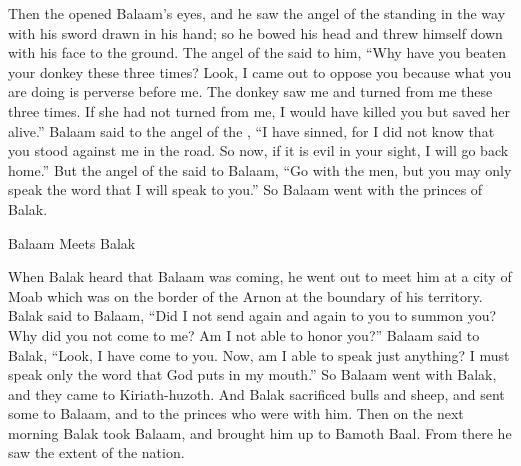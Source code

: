 {Then the
{}
opened Balaam’s
eyes,
and he saw
the angel
of the {}
standing
in the way
with his sword
drawn
in his hand;
so he bowed
his head and threw himself down
with his face to the ground.
The angel
of the {}
said
to
him, “Why
have you beaten
your donkey
these
three
times? Look,
I
came out
to oppose
you because
what you are doing
is perverse
before me.
The donkey
saw
me and turned
from me these
three
times.
If
she had
not turned
from me, I would
have
killed
you but saved her alive.”
Balaam
said
to
the angel
of the {}, “I have sinned,
for
I did not
know
that
you
stood
against
me in the road.
So now,
if
it is evil
in your sight,
I will go back home.”
But the angel
of the {}
said to
Balaam,
“Go
with
the men,
but you may only
speak
the word
that
I will speak
to
you.” So
Balaam
went
with
the princes
of Balak.
\par }{\SH Balaam Meets Balak
\par }{\PP {}When Balak
heard
that
Balaam
was coming,
he went out
to meet
him at a city
of Moab
which
was on
the border
of the Arnon
at
the boundary
of his territory.
Balak
said
to
Balaam,
“Did I not
send again
and again
to
you to summon
you? Why
did you not
come
to me? Am
I not
able
to honor you?”
Balaam
said
to
Balak,
“Look,
I have come
to
you. Now,
am I able
to speak
just anything? I must speak
only the word
that
God
puts
in my mouth.”
So Balaam
went
with
Balak,
and they came
to Kiriath-huzoth.
And Balak
sacrificed
bulls
and sheep,
and sent
some to Balaam,
and to the princes
who
were with him.
Then
on the next morning
Balak
took
Balaam,
and brought him up
to Bamoth
Baal. From there
he saw
the extent
of the nation.


}
